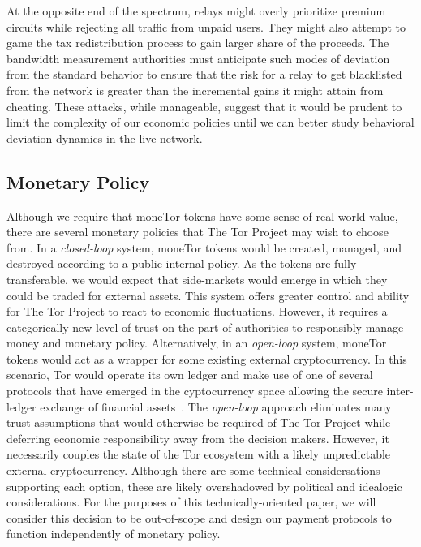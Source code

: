At the opposite end of the spectrum, relays might overly prioritize premium
circuits while rejecting all traffic from unpaid users. They might also attempt
to game the tax redistribution process to gain larger share of the proceeds. The
bandwidth measurement authorities must anticipate such modes of deviation from
the standard behavior to ensure that the risk for a relay to get blacklisted
from the network is greater than the incremental gains it might attain from
cheating. These attacks, while manageable, suggest that it would be prudent to
limit the complexity of our economic policies until we can better study
behavioral deviation dynamics in the live network.


\subsection{Monetary Policy}

Although we require that moneTor tokens have some sense of real-world value,
there are several monetary policies that The Tor Project may wish to choose
from. In a \emph{closed-loop} system, moneTor tokens would be created, managed,
and destroyed according to a public internal policy. As the tokens are fully
transferable, we would expect that side-markets would emerge in which they could
be traded for external assets. This system offers greater control and ability
for The Tor Project to react to economic fluctuations. However, it requires a
categorically new level of trust on the part of authorities to responsibly
manage money and monetary policy. Alternatively, in an \emph{open-loop} system,
moneTor tokens would act as a wrapper for some existing external cryptocurrency.
In this scenario, Tor would operate its own ledger and make use of one of
several protocols that have emerged in the cyptocurrency space allowing the
secure inter-ledger exchange of financial assets~\cite{back2014enabling,
  poon2017plasma}. The \emph{open-loop} approach eliminates many trust
assumptions that would otherwise be required of The Tor Project while deferring
economic responsibility away from the decision makers. However, it necessarily
couples the state of the Tor ecosystem with a likely unpredictable external
cryptocurrency. Although there are some technical considersations supporting
each option, these are likely overshadowed by political and idealogic
considerations. For the purposes of this technically-oriented paper, we will
consider this decision to be out-of-scope and design our payment protocols to
function independently of monetary policy.

